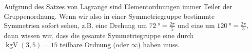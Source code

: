 \begin{remark}
Aufgrund des Satzes von Lagrange sind Elementordnungen immer Teiler der Gruppenordnung. Wenn wir also in einer Symmetriegruppe bestimmte Symmetrien sofort sehen, z.B. eine Drehung um $\SI{72}{\degree}=\frac{2\pi}{5}$ und eine um $\SI{120}{\degree}=\frac{2\pi}{3}$, dann wissen wir, dass die gesamte Symmetriegruppe eine durch $\operatorname{kgV}(3,5)=15$ teilbare Ordnung (oder $\infty$) haben muss.
\end{remark}

